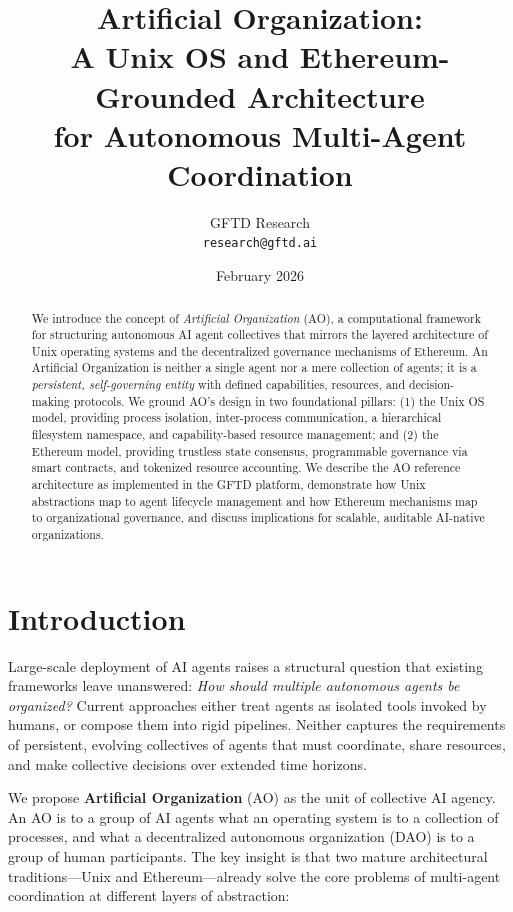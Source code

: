 \documentclass[11pt,a4paper]{article}
\title{Artificial Organization: \\ A Unix OS and Ethereum-Grounded Architecture \\ for Autonomous Multi-Agent Coordination}
\author{
  GFTD Research \\
  \texttt{research@gftd.ai}
}
\date{February 2026}
\begin{document}
\maketitle

\begin{abstract}
We introduce the concept of \emph{Artificial Organization} (AO), a computational
framework for structuring autonomous AI agent collectives that mirrors the
layered architecture of Unix operating systems and the decentralized governance
mechanisms of Ethereum. An Artificial Organization is neither a single agent nor
a mere collection of agents; it is a \emph{persistent, self-governing entity}
with defined capabilities, resources, and decision-making protocols. We ground
AO's design in two foundational pillars: (1) the Unix OS model, providing
process isolation, inter-process communication, a hierarchical filesystem
namespace, and capability-based resource management; and (2) the Ethereum
model, providing trustless state consensus, programmable governance via smart
contracts, and tokenized resource accounting. We describe the AO reference
architecture as implemented in the GFTD platform, demonstrate how Unix
abstractions map to agent lifecycle management and how Ethereum mechanisms map
to organizational governance, and discuss implications for scalable, auditable
AI-native organizations.
\end{abstract}

\section{Introduction}

Large-scale deployment of AI agents raises a structural question that existing
frameworks leave unanswered: \emph{How should multiple autonomous agents be
organized?} Current approaches either treat agents as isolated tools invoked by
humans, or compose them into rigid pipelines. Neither captures the requirements
of persistent, evolving collectives of agents that must coordinate, share
resources, and make collective decisions over extended time horizons.

We propose \textbf{Artificial Organization} (AO) as the unit of collective AI
agency. An AO is to a group of AI agents what an operating system is to a
collection of processes, and what a decentralized autonomous organization (DAO)
is to a group of human participants. The key insight is that two mature
architectural traditions---Unix and Ethereum---already solve the core problems
of multi-agent coordination at different layers of abstraction:
\end{document}
